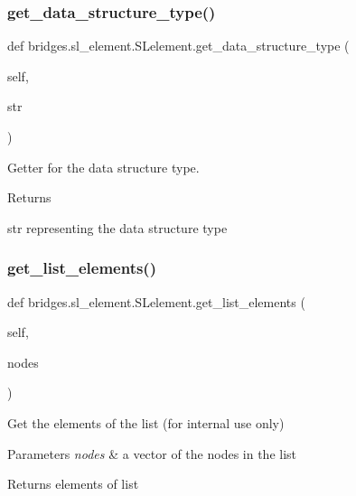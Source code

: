 \subsubsection{\texorpdfstring{get\+\_\+data\+\_\+structure\+\_\+type()}{get\_data\_structure\_type()}}
{\footnotesize\ttfamily def bridges.\+sl\+\_\+element.\+S\+Lelement.\+get\+\_\+data\+\_\+structure\+\_\+type (\begin{DoxyParamCaption}\item[{}]{self,  }\item[{}]{str }\end{DoxyParamCaption})}



Getter for the data structure type. 

\begin{DoxyReturn}{Returns}


str representing the data structure type 
\end{DoxyReturn}
\mbox{\label{classbridges_1_1sl__element_1_1_s_lelement_ad3b94c8e7540aca841e6306c190e1be1}} 
\subsubsection{\texorpdfstring{get\+\_\+list\+\_\+elements()}{get\_list\_elements()}}
{\footnotesize\ttfamily def bridges.\+sl\+\_\+element.\+S\+Lelement.\+get\+\_\+list\+\_\+elements (\begin{DoxyParamCaption}\item[{}]{self,  }\item[{}]{nodes }\end{DoxyParamCaption})}



Get the elements of the list (for internal use only) 


\begin{DoxyParams}{Parameters}
{\em nodes} & a vector of the nodes in the list \\
\hline
\end{DoxyParams}
\begin{DoxyReturn}{Returns}
elements of list 
\end{DoxyReturn}
\mbox{\label{classbridges_1_1sl__element_1_1_s_lelement_a60570a813d474577ab1150bdd60137f9}} 
